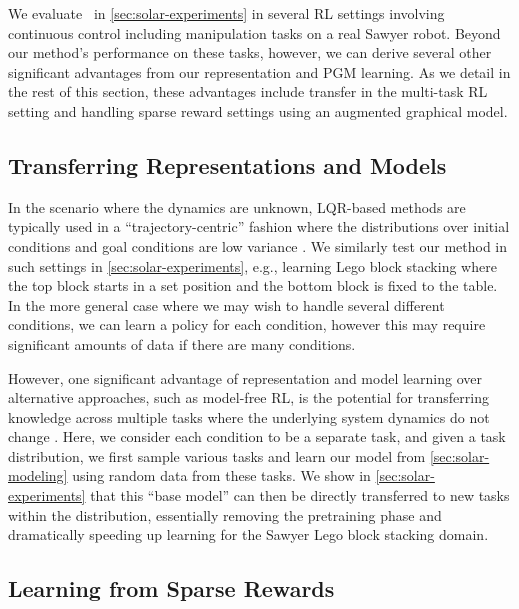We evaluate \metabbr\ in \autoref{sec:solar-experiments} in several RL settings involving continuous control including manipulation tasks on a real Sawyer robot. Beyond our method's performance on these tasks, however, we can derive several other significant advantages from our representation and PGM learning. As we detail in the rest of this section, these advantages include transfer in the multi-task RL setting and handling sparse reward settings using an augmented graphical model.

\subsection{Transferring Representations and Models}
\label{sec:transfer}

In the scenario where the dynamics are unknown, LQR-based methods are typically used in a ``trajectory-centric'' fashion where the distributions over initial conditions and goal conditions are low variance \citep{mfcgps,pilqr}. We similarly test our method in such settings in \autoref{sec:solar-experiments}, e.g., learning Lego block stacking where the top block starts in a set position and the bottom block is fixed to the table. In the more general case where we may wish to handle several different conditions, we can learn a policy for each condition, however this may require significant amounts of data if there are many conditions.

However, one significant advantage of representation and model learning over alternative approaches, such as model-free RL, is the potential for transferring knowledge across multiple tasks where the underlying system dynamics do not change \citep{srl-survey}. Here, we consider each condition to be a separate task, and given a task distribution, we first sample various tasks and learn our model from \autoref{sec:solar-modeling} using random data from these tasks. We show in \autoref{sec:solar-experiments} that this ``base model'' can then be directly transferred to new tasks within the distribution, essentially removing the pretraining phase and dramatically speeding up learning for the Sawyer Lego block stacking domain.

\subsection{Learning from Sparse Rewards}
\label{sec:sparse}

